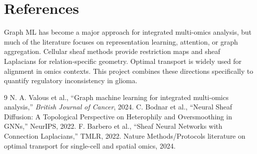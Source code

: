 \documentclass[11pt]{article}
\begin{document}
\section{References}
Graph ML has become a major approach for integrated multi-omics analysis, but much of the literature focuses on representation learning, attention, or graph aggregation. Cellular sheaf methods provide restriction maps and sheaf Laplacians for relation-specific geometry. Optimal transport is widely used for alignment in omics contexts. This project combines these directions specifically to quantify regulatory inconsistency in glioma.

\begin{thebibliography}{9}
 N. A. Valous et al., ``Graph machine learning for integrated multi-omics analysis,'' \emph{British Journal of Cancer}, 2024.
 C. Bodnar et al., ``Neural Sheaf Diffusion: A Topological Perspective on Heterophily and Oversmoothing in GNNs,'' NeurIPS, 2022.
 F. Barbero et al., ``Sheaf Neural Networks with Connection Laplacians,'' TMLR, 2022.
 Nature Methods/Protocols literature on optimal transport for single-cell and spatial omics, 2024.
\end{thebibliography}
\end{document}
